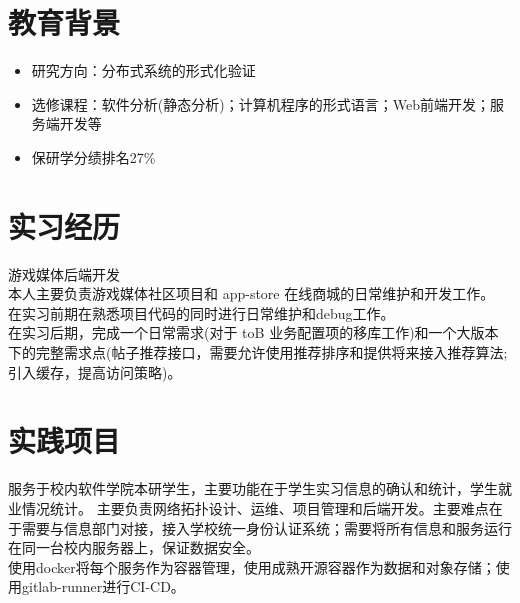 \documentclass{resume}
\begin{document}

\sepspace
{}

\section{教育背景}
\begin{itemize}
    \item 研究方向：分布式系统的形式化验证
\end{itemize}
\begin{itemize}
    \item 选修课程：软件分析(静态分析)；计算机程序的形式语言；Web前端开发；服务端开发等
    \item 保研学分绩排名27\%
\end{itemize}
\sepspace

\section{实习经历}
\Content
{{游戏媒体后端开发}}
{{\\本人主要负责游戏媒体社区项目和 app-store 在线商城的日常维护和开发工作。}{\\在实习前期在熟悉项目代码的同时进行日常维护和debug工作。}{\\在实习后期，完成一个日常需求(对于 toB 业务配置项的移库工作)和一个大版本下的完整需求点(帖子推荐接口，需要允许使用推荐排序和提供将来接入推荐算法;引入缓存，提高访问策略)。}}
\sepspace

\section{实践项目}
\Contents
{服务于校内软件学院本研学生，主要功能在于学生实习信息的确认和统计，学生就业情况统计。}
{主要负责网络拓扑设计、运维、项目管理和后端开发。主要难点在于需要与信息部门对接，接入学校统一身份认证系统；需要将所有信息和服务运行在同一台校内服务器上，保证数据安全。\\使用docker将每个服务作为容器管理，使用成熟开源容器作为数据和对象存储；使用gitlab-runner进行CI-CD。 }
\end{document}
